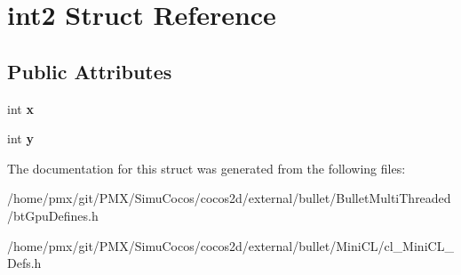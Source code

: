 \hypertarget{structint2}{}\section{int2 Struct Reference}
\label{structint2}
\subsection*{Public Attributes}
\begin{DoxyCompactItemize}
\item 
\mbox{\label{structint2_a2b4908d6f7ae421393c0ec0233e90551}} 
int {\bfseries x}
\item 
\mbox{\label{structint2_a3d7ff3bd7734f8c2f38613a4da5e6c83}} 
int {\bfseries y}
\end{DoxyCompactItemize}


The documentation for this struct was generated from the following files\+:\begin{DoxyCompactItemize}
\item 
/home/pmx/git/\+P\+M\+X/\+Simu\+Cocos/cocos2d/external/bullet/\+Bullet\+Multi\+Threaded/bt\+Gpu\+Defines.\+h\item 
/home/pmx/git/\+P\+M\+X/\+Simu\+Cocos/cocos2d/external/bullet/\+Mini\+C\+L/cl\+\_\+\+Mini\+C\+L\+\_\+\+Defs.\+h\end{DoxyCompactItemize}
